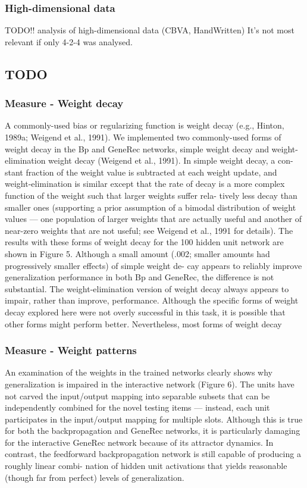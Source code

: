 \subsubsection{High-dimensional data} 
TODO!! analysis of high-dimensional data (CBVA, HandWritten) 
It's not most relevant if only 4-2-4 was analysed. 

\subsection{TODO} 

\subsubsection{Measure - Weight decay}
A commonly-used bias or regularizing function is weight decay (e.g., Hinton, 1989a; Weigend et al., 1991).
We implemented two commonly-used forms of weight decay in the Bp and GeneRec networks, simple
weight decay and weight-elimination weight decay (Weigend et al., 1991). In simple weight decay, a con-
stant fraction of the weight value is subtracted at each weight update, and weight-elimination is similar
except that the rate of decay is a more complex function of the weight such that larger weights suffer rela-
tively less decay than smaller ones (supporting a prior assumption of a bimodal distribution of weight values
— one population of larger weights that are actually useful and another of near-zero weights that are not
useful; see Weigend et al., 1991 for details).
The results with these forms of weight decay for the 100 hidden unit network are shown in Figure 5.
Although a small amount (.002; smaller amounts had progressively smaller effects) of simple weight de-
cay appears to reliably improve generalization performance in both Bp and GeneRec, the difference is not
substantial. The weight-elimination version of weight decay always appears to impair, rather than improve,
performance. Although the specific forms of weight decay explored here were not overly successful in
this task, it is possible that other forms might perform better. Nevertheless, most forms of weight decay
\citet{o2001generalization} 

\subsubsection{Measure - Weight patterns} 
An examination of the weights in the trained networks clearly shows why generalization is impaired in the
interactive network (Figure 6). The units have not carved the input/output mapping into separable subsets
that can be independently combined for the novel testing items — instead, each unit participates in the
input/output mapping for multiple slots. Although this is true for both the backpropagation and GeneRec
networks, it is particularly damaging for the interactive GeneRec network because of its attractor dynamics.
In contrast, the feedforward backpropagation network is still capable of producing a roughly linear combi-
nation of hidden unit activations that yields reasonable (though far from perfect) levels of generalization. \citet{o2001generalization} 

